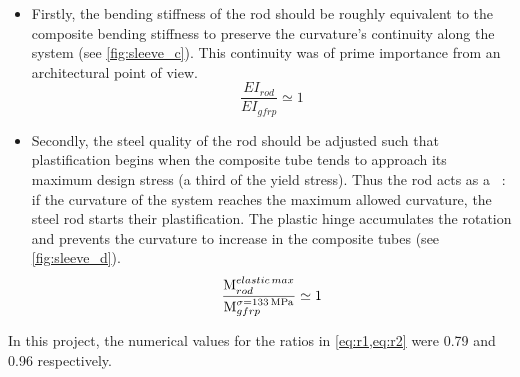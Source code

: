 \begin{itemize}
\item
Firstly, the bending stiffness of the rod should be roughly equivalent to the composite bending stiffness to preserve the curvature’s continuity along the system  (see \cref{fig:sleeve_c}). This continuity was of prime importance from an architectural point of view.
\begin{equation}
	\frac{EI_{rod}}{EI_{gfrp}} \simeq 1
	\label{eq:r1}
\end{equation}
\item



Secondly, the steel quality of the rod should be adjusted such that plastification begins when the composite tube tends to approach its maximum design stress (a third of the yield stress). Thus the rod acts as a ~: if the curvature of the system reaches the maximum allowed curvature, the steel rod starts their plastification. The plastic hinge accumulates the rotation and prevents the curvature to increase in the composite tubes (see \cref{fig:sleeve_d}).
\begin{equation}
	\frac{\raisebox{0.2ex}M^{elastic\,max}_{rod}}{\raisebox{-0.2ex}M^{\sigma = \SI{133}{MPa}}_{gfrp}} \simeq 1
	\label{eq:r2}
\end{equation}
\end{itemize}
In this project, the numerical values for the ratios in \cref{eq:r1,eq:r2} were 0.79 and 0.96 respectively.


